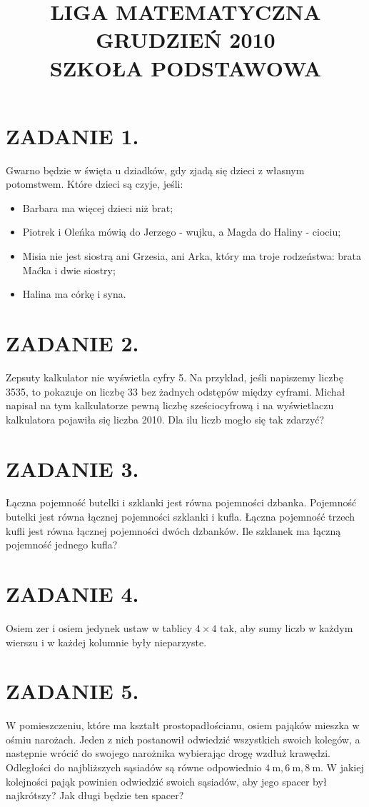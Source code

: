 \documentclass[10pt]{article}
\title{LIGA MATEMATYCZNA \\
 GRUDZIEŃ 2010 \\
 SZKOŁA PODSTAWOWA }
\author{}
\date{}
\begin{document}
\maketitle
\section*{ZADANIE 1.}
Gwarno będzie w święta u dziadków, gdy zjadą się dzieci z własnym potomstwem. Które dzieci są czyje, jeśli:

\begin{itemize}
  \item Barbara ma więcej dzieci niż brat;
  \item Piotrek i Oleńka mówią do Jerzego - wujku, a Magda do Haliny - ciociu;
  \item Misia nie jest siostrą ani Grzesia, ani Arka, który ma troje rodzeństwa: brata Maćka i dwie siostry;
  \item Halina ma córkę i syna.
\end{itemize}

\section*{ZADANIE 2.}
Zepsuty kalkulator nie wyświetla cyfry 5. Na przykład, jeśli napiszemy liczbę 3535, to pokazuje on liczbę 33 bez żadnych odstępów między cyframi. Michał napisał na tym kalkulatorze pewną liczbę sześciocyfrową i na wyświetlaczu kalkulatora pojawiła się liczba 2010. Dla ilu liczb mogło się tak zdarzyć?

\section*{ZADANIE 3.}
Łączna pojemność butelki i szklanki jest równa pojemności dzbanka. Pojemność butelki jest równa łącznej pojemności szklanki i kufla. Łączna pojemność trzech kufli jest równa łącznej pojemności dwóch dzbanków. Ile szklanek ma łączną pojemność jednego kufla?

\section*{ZADANIE 4.}
Osiem zer i osiem jedynek ustaw w tablicy \(4 \times 4\) tak, aby sumy liczb w każdym wierszu i w każdej kolumnie były nieparzyste.

\section*{ZADANIE 5.}
W pomieszczeniu, które ma kształt prostopadłościanu, osiem pająków mieszka w ośmiu narożach. Jeden z nich postanowił odwiedzić wszystkich swoich kolegów, a następnie wrócić do swojego narożnika wybierając drogę wzdłuż krawędzi. Odległości do najbliższych sąsiadów są równe odpowiednio \(4 \mathrm{~m}, 6 \mathrm{~m}, 8 \mathrm{~m}\). W jakiej kolejności pająk powinien odwiedzić swoich sąsiadów, aby jego spacer był najkrótszy? Jak długi będzie ten spacer?
\end{document}
